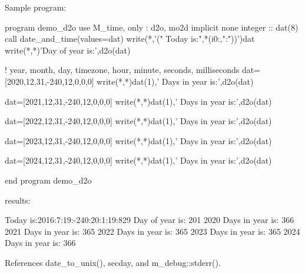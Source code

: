 \begin{DoxyVerb}Sample program:

 program demo_d2o
 use M_time, only : d2o, mo2d
 implicit none
 integer :: dat(8)
    call date_and_time(values=dat)
    write(*,'(" Today is:",*(i0:,":"))')dat
    write(*,*)'Day of year is:',d2o(dat)

    ! year, month, day, timezone, hour, minute, seconds, milliseconds
    dat=[2020,12,31,-240,12,0,0,0]
    write(*,*)dat(1),' Days in year is:',d2o(dat)

    dat=[2021,12,31,-240,12,0,0,0]
    write(*,*)dat(1),' Days in year is:',d2o(dat)

    dat=[2022,12,31,-240,12,0,0,0]
    write(*,*)dat(1),' Days in year is:',d2o(dat)

    dat=[2023,12,31,-240,12,0,0,0]
    write(*,*)dat(1),' Days in year is:',d2o(dat)

    dat=[2024,12,31,-240,12,0,0,0]
    write(*,*)dat(1),' Days in year is:',d2o(dat)

 end program demo_d2o

results:

 Today is:2016:7:19:-240:20:1:19:829
 Day of year is:         201
        2020  Days in year is:         366
        2021  Days in year is:         365
        2022  Days in year is:         365
        2023  Days in year is:         365
        2024  Days in year is:         366 \end{DoxyVerb}
 

References date\+\_\+to\+\_\+unix(), secday, and m\+\_\+debug\+::stderr().

